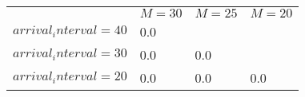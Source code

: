 \begin{tabular}{l  | l  | l  | l }
& \multicolumn{1}{c}{$M=30$} & \multicolumn{1}{c}{$M=25$} & \multicolumn{1}{c}{$M=20$} \\
$arrival_interval=40$ & 0.0 &  &  \\
$arrival_interval=30$ & 0.0 & 0.0 &  \\
$arrival_interval=20$ & 0.0 & 0.0 & 0.0
\end{tabular}